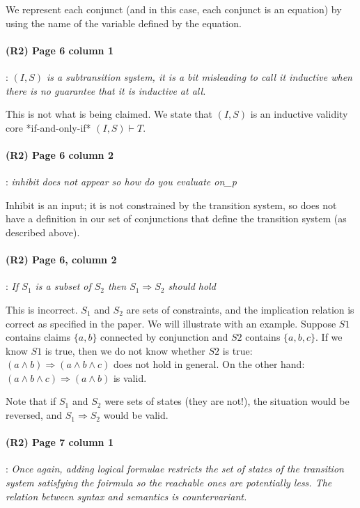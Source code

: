 \documentclass{article}
\begin{document}
We represent each conjunct (and in this case, each conjunct is an equation) by using the name of the variable defined by the equation.

\paragraph{(R2) Page 6 column 1}: \textit{$(I, S)$ is a subtransition system, it is a bit
misleading to call it inductive when there is no guarantee that it
is inductive at all.}
\vspace{0.05in}

\noindent This is not what is being claimed. We state that $(I, S)$ is an
inductive validity core *if-and-only-if* $(I, S) \vdash T$.

\paragraph{(R2) Page 6 column 2}: \textit{inhibit does not appear so how do you evaluate
on\_p}
\vspace{0.05in}

\noindent Inhibit is an input; it is not constrained by the transition
system, so does not have a definition in our set of conjunctions
that define the transition system (as described above).

\newcommand{\implies}[0]{\Rightarrow}
\newcommand{\mkeyword}[1]{\mbox{\texttt{#1}}}

\paragraph{(R2) Page 6, column 2}: \textit{If $S_1$ is a subset of $S_2$ then $S_1 \implies S_2$ should hold}
\vspace{0.05in}

\noindent This is incorrect. $S_1$ and $S_2$ are sets of constraints, and the implication relation is correct as specified in the paper.  We will illustrate with an example. Suppose $S1$ contains claims $\{a, b\}$ connected by conjunction and $S2$ contains $\{a,
b, c\}$.  If we know $S1$ is true, then we do not know whether $S2$ is true: $(a \land
b) \implies (a \land b \land c)$ does not hold in general.  On the other hand: $(a \land b \land c) \implies (a \land b)$ is valid.

Note that if $S_1$ and $S_2$ were sets of states (they are not!), the situation would be reversed, and $S_1 \implies S_2$ would be valid.


\paragraph{(R2) Page 7 column 1}:
\textit{Once again, adding logical formulae restricts the set of states of the transition system satisfying the foirmula so
the reachable ones are potentially less. The relation between syntax and
semantics is countervariant.}
\vspace{0.05in}
\end{document}
